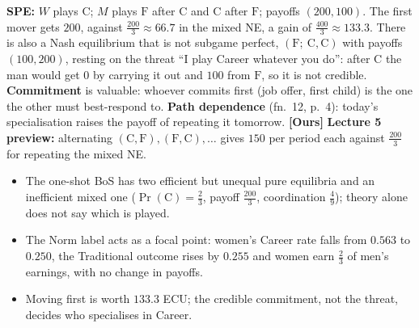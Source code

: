 \documentclass[10pt,a4paper]{article}
\newcommand{\ours}{\textcolor{warn}{\textbf{[Ours]}}}
\newcommand{\C}{\mathrm{C}}
\newcommand{\Fm}{\mathrm{F}}
\begin{document}
\begin{center}
\end{center}
\textbf{SPE:} $W$ plays $\C$; $M$ plays $\Fm$ after $\C$ and $\C$ after $\Fm$; payoffs $(200,100)$. The
first mover gets $200$, against $\tfrac{200}{3}\approx66.7$ in the mixed NE, a gain of
$\tfrac{400}{3}\approx133.3$. There is also a Nash equilibrium that is not subgame perfect,
$(\Fm;\ \C,\C)$ with payoffs $(100,200)$, resting on the threat ``I play Career whatever you do'':
after $\C$ the man would get $0$ by carrying it out and $100$ from $\Fm$, so it is not credible.
\textbf{Commitment} is valuable: whoever commits first (job offer, first child) is the one the
other must best-respond to. \textbf{Path dependence} (fn.~12, p.~4): today's specialisation raises
the payoff of repeating it tomorrow.
\ours{} \textbf{Lecture 5 preview:} alternating $(\C,\Fm),(\Fm,\C),\dots$ gives $150$ per period each
against $\tfrac{200}{3}$ for repeating the mixed NE.

\begin{tcolorbox}[colback=src!4,colframe=src,boxrule=0.5pt,left=5pt,right=5pt,top=3pt,bottom=3pt,
  title={Takeaway}]
\begin{itemize}[leftmargin=1.2em]
  \item The one-shot BoS has two efficient but unequal pure equilibria and an inefficient mixed one
    ($\Pr(\C)=\tfrac23$, payoff $\tfrac{200}{3}$, coordination $\tfrac49$); theory alone does not say which is played.
  \item The Norm label acts as a focal point: women's Career rate falls from $0.563$ to $0.250$,
    the Traditional outcome rises by $0.255$ and women earn $\tfrac23$ of men's earnings, with no change in payoffs.
  \item Moving first is worth $133.3$ ECU; the credible commitment, not the threat, decides who
    specialises in Career.
\end{itemize}
\end{tcolorbox}
\end{document}
